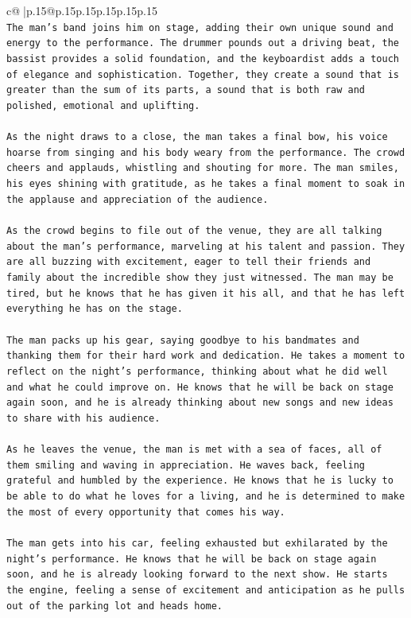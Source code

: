 \documentclass{article}
\begin{document}
{\begin{supertabular}{c@{$\;$}|p{.15\linewidth}@{}p{.15\linewidth}p{.15\linewidth}p{.15\linewidth}p{.15\linewidth}p{.15\linewidth}}
{{{\\ 
\texttt{The man's band joins him on stage, adding their own unique sound and energy to the performance. The drummer pounds out a driving beat, the bassist provides a solid foundation, and the keyboardist adds a touch of elegance and sophistication. Together, they create a sound that is greater than the sum of its parts, a sound that is both raw and polished, emotional and uplifting.} \\
\\ 
\texttt{As the night draws to a close, the man takes a final bow, his voice hoarse from singing and his body weary from the performance. The crowd cheers and applauds, whistling and shouting for more. The man smiles, his eyes shining with gratitude, as he takes a final moment to soak in the applause and appreciation of the audience.} \\
\\ 
\texttt{As the crowd begins to file out of the venue, they are all talking about the man's performance, marveling at his talent and passion. They are all buzzing with excitement, eager to tell their friends and family about the incredible show they just witnessed. The man may be tired, but he knows that he has given it his all, and that he has left everything he has on the stage.} \\
\\ 
\texttt{The man packs up his gear, saying goodbye to his bandmates and thanking them for their hard work and dedication. He takes a moment to reflect on the night's performance, thinking about what he did well and what he could improve on. He knows that he will be back on stage again soon, and he is already thinking about new songs and new ideas to share with his audience.} \\
\\ 
\texttt{As he leaves the venue, the man is met with a sea of faces, all of them smiling and waving in appreciation. He waves back, feeling grateful and humbled by the experience. He knows that he is lucky to be able to do what he loves for a living, and he is determined to make the most of every opportunity that comes his way.} \\
\\ 
\texttt{The man gets into his car, feeling exhausted but exhilarated by the night's performance. He knows that he will be back on stage again soon, and he is already looking forward to the next show. He starts the engine, feeling a sense of excitement and anticipation as he pulls out of the parking lot and heads home.} \\
}}}
\end{supertabular}}
\end{document}
